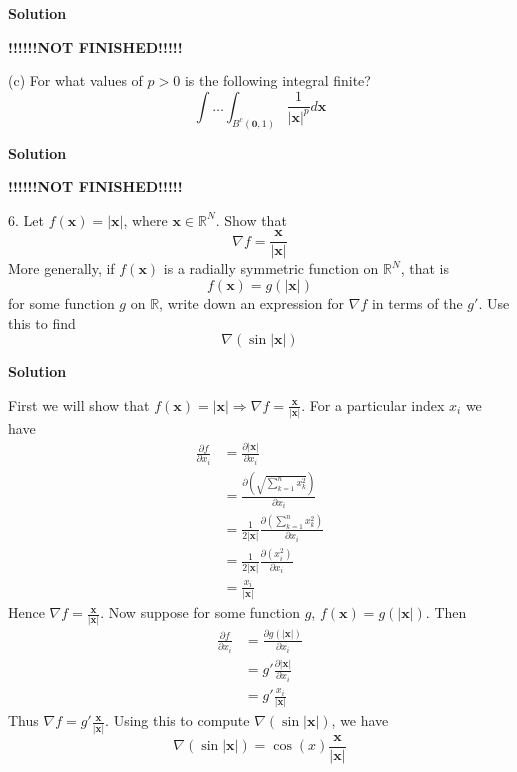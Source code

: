 \documentclass{article}
\begin{document}
\textbf{Solution}

\quad \textbf{!!!!!!NOT FINISHED!!!!!}

\vspace{5mm}
(c) For what values of $p > 0$ is the following integral finite?
%
\begin{equation}
    \int \ldots \int_{B^{c}(\mathbf{0}, 1)} \frac{1}{|\mathbf{x}|^{p}} d \mathbf{x}
    \label{eq:p2q3c}
\end{equation}

\textbf{Solution}

\quad \textbf{!!!!!!NOT FINISHED!!!!!}

\vspace{5mm}
6. Let $f(\mathbf{x}) = |\mathbf{x}|$, where $\mathbf{x} \in \mathbb{R}^{N}$.
Show that $$\nabla f = \frac{\mathbf{x}}{|\mathbf{x}|}$$ More generally,
if $f(\mathbf{x})$ is a radially symmetric function on $\mathbb{R}^{N}$,
that is $$f(\mathbf{x}) = g(|\mathbf{x}|)$$ for some function $g$ on
$\mathbb{R}$, write down an expression for $\nabla f$ in terms of the $g'$.
Use this to find $$\nabla(\sin |\mathbf{x}|)$$

\textbf{Solution}

First we will show that
$f(\mathbf{x}) = |\mathbf{x}| \Rightarrow \nabla f = \frac{\mathbf{x}}{|\mathbf{x}|}$.
For a particular index $x_i$ we have
%
\begin{align*}
    \frac{\partial f}{\partial x_i}
        &= \frac{\partial |\mathbf{x}|}{\partial x_i} \\
        &= \frac{\partial (\sqrt{\sum_{k=1}^n x_k^2})}{\partial x_i} \\
        &= \frac{1}{2 |\mathbf{x}|} \frac{\partial (\sum_{k=1}^n x_k^2)}{\partial x_i} \\
        &= \frac{1}{2 |\mathbf{x}|} \frac{\partial (x_i^2)}{\partial x_i} \\
        &= \frac{x_i}{|\mathbf{x}|}
\end{align*}
%
Hence $\nabla f = \frac{\mathbf{x}}{|\mathbf{x}|}$. Now suppose for some
function $g$, $f(\mathbf{x}) = g(|\mathbf{x}|)$. Then
%
\begin{align*}
    \frac{\partial f}{\partial x_i}
        &= \frac{\partial g(|\mathbf{x}|)}{\partial x_i} \\
        &= g' \frac{\partial |\mathbf{x}|}{\partial x_i} \\
        &= g' \frac{x_i}{|\mathbf{x}|}
\end{align*}
%
Thus $\nabla f = g' \frac{\mathbf{x}}{|\mathbf{x}|}$. Using this to
compute $\nabla(\sin |\mathbf{x}|)$, we have
%
\begin{equation*}
    \nabla(\sin |\mathbf{x}|) = \cos(x) \frac{\mathbf{x}}{|\mathbf{x}|}
\end{equation*}
\end{document}
